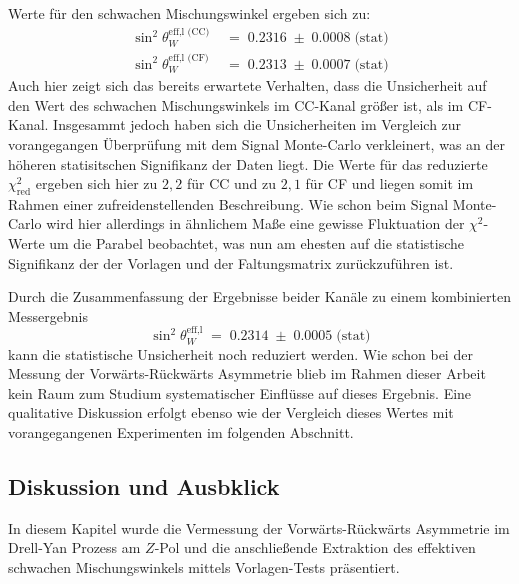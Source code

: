Werte für den schwachen Mischungswinkel ergeben sich zu:
\begin{align*}
    \sin^2\theta_W^\text{eff,l (CC)} &\;=\; 0.2316
        \;\pm\; 0.0008 \;\text{(stat)}
    \\[5pt]
    \sin^2\theta_W^\text{eff,l (CF)} &\;=\; 0.2313
        \;\pm\; 0.0007 \;\text{(stat)}
\end{align*}
Auch hier zeigt sich das bereits erwartete Verhalten, dass die Unsicherheit auf
den Wert des schwachen Mischungswinkels im \ac{CC}-Kanal größer ist, als im
\ac{CF}-Kanal. Insgesammt jedoch haben sich die Unsicherheiten im Vergleich zur
vorangegangen Überprüfung mit dem Signal Monte-Carlo verkleinert, was an der
höheren statisitschen Signifikanz der Daten liegt. Die Werte für das reduzierte
$\chi^2_\text{red}$ ergeben sich hier zu $2,2$ für \ac{CC} und zu $2,1$ für
\ac{CF} und liegen somit im Rahmen einer zufreidenstellenden Beschreibung.
Wie schon beim Signal Monte-Carlo wird hier allerdings in ähnlichem Maße eine
gewisse Fluktuation der $\chi^2$-Werte um die Parabel beobachtet, was nun am
ehesten auf die statistische Signifikanz der der Vorlagen und der
Faltungsmatrix zurückzuführen ist.

Durch die Zusammenfassung der Ergebnisse beider Kanäle zu einem kombinierten
Messergebnis 
\begin{equation}
    \sin^2\theta_W^\text{eff,l} \;=\; 0.2314
        \;\pm\; 0.0005 \;\text{(stat)}
\end{equation}
kann die statistische Unsicherheit noch reduziert werden. Wie schon bei der
Messung der Vorwärts-Rückwärts Asymmetrie blieb im Rahmen dieser Arbeit kein
Raum zum Studium systematischer Einflüsse auf dieses Ergebnis. Eine qualitative
Diskussion erfolgt ebenso wie der Vergleich dieses Wertes mit vorangegangenen
Experimenten im folgenden Abschnitt.



\subsection{Diskussion und Ausbklick}
\label{afb:diskussion}

In diesem Kapitel wurde die Vermessung der Vorwärts-Rückwärts Asymmetrie im
Drell-Yan Prozess am $Z$-Pol und die anschließende Extraktion des effektiven
schwachen Mischungswinkels mittels Vorlagen-Tests präsentiert.

